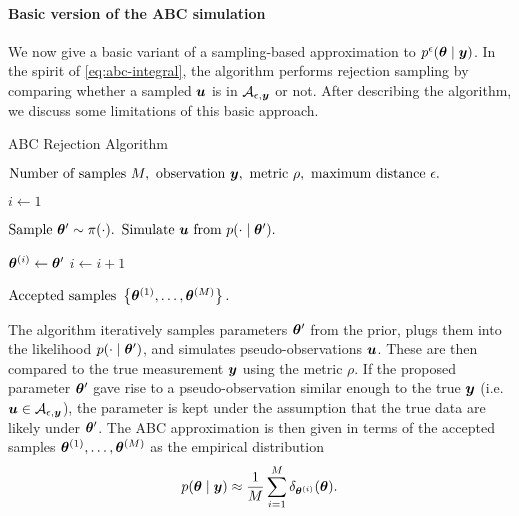 \paragraph{Basic version of the ABC simulation}
We now give a basic variant of a sampling-based approximation to $p^\epsilon(\bm{\theta} \mid \bm{y})$. In the spirit of \eqref{eq:abc-integral}, the algorithm performs rejection sampling by comparing whether a sampled $\bm{u}$ is in $\mathcal{A}_{\epsilon, \bm{y}}$ or not. After describing the algorithm, we discuss some limitations of this basic approach.
\begin{algorithm}[ht]
    \caption{ABC Rejection Algorithm}
    \label{alg:abc-rejection}
    \begin{algorithmic}[1]
        \Input $\text{Number of samples } M, \text{ observation } \bm{y}, \text{ metric } \rho, \text{ maximum distance } \epsilon.$
        
        \State $i \gets 1$
        
        \State $\text{Sample } \bm{\theta}^\prime \sim \pi(\cdot).$ 
        \State $\text{Simulate } \bm{u} \text{ from } p(\cdot \mid \bm{\theta}^\prime).$ 
        
        \If {$\rho(\bu, \by) \leq \epsilon$}
        \State $\bm{\theta}^{(i)} \gets \bm{\theta}^\prime$ 
        \State $i \gets i + 1$
        \EndIf
        \EndWhile
        
        \Output $\text{Accepted samples } \left\{ \bm{\theta}^{(1)}, \ldots, \bm{\theta}^{(M)} \right\}.$
    \end{algorithmic}
\end{algorithm}

The algorithm iteratively samples parameters $\bm{\theta}^\prime$ from the prior, plugs them into the likelihood $p(\cdot \mid \bm{\theta}^\prime)$, and simulates pseudo-observations $\bm{u}$. These are then compared to the true measurement $\bm{y}$ using the metric $\rho$. If the proposed parameter $\bm{\theta}^\prime$ gave rise to a pseudo-observation similar enough to the true $\bm{y}$ (i.e. $\bm{u} \in \mathcal{A}_{\epsilon, \bm{y}}$), the parameter is kept under the assumption that the true data are likely under $\bm{\theta}^\prime$. The ABC approximation is then given in terms of the accepted samples $\bm{\theta}^{(1)}, \ldots, \bm{\theta}^{(M)}$ as the empirical distribution
\begin{equation*}
p(\bm{\theta} \mid \bm{y}) \approx \frac{1}{M} \sum_{i=1}^M \delta_{\bm{\theta}^{(i)}}(\bm{\theta}).
\end{equation*}

